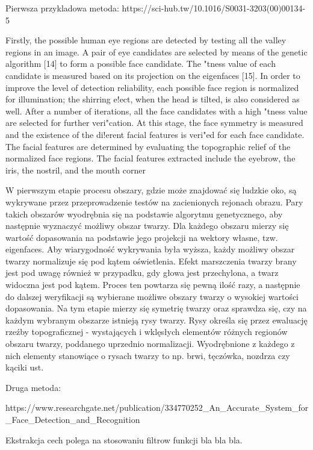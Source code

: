 Pierwsza przykladowa metoda:
https://sci-hub.tw/10.1016/S0031-3203(00)00134-5

Firstly, the possible human eye regions are detected by
testing all the valley regions in an image. A pair of eye
candidates are selected by means of the genetic algorithm
[14] to form a possible face candidate. The "tness value
of each candidate is measured based on its projection on
the eigenfaces [15]. In order to improve the level of
detection reliability, each possible face region is normalized for illumination; the shirring e!ect, when the
head is tilted, is also considered as well. After a number of
iterations, all the face candidates with a high "tness value
are selected for further veri"cation. At this stage, the face
symmetry is measured and the existence of the di!erent
facial features is veri"ed for each face candidate. The
facial features are determined by evaluating the topographic relief of the normalized face regions. The facial
features extracted include the eyebrow, the iris, the
nostril, and the mouth corner

W pierwszym etapie procesu obszary, gdzie może znajdować się ludzkie oko, są wykrywane przez przeprowadzenie testów na zacienionych rejonach obrazu. Pary takich obszarów wyodrębnia się na podstawie algorytmu genetycznego, aby następnie wyznaczyć możliwy obszar twarzy. Dla każdego obszaru mierzy się wartość dopasowania na podstawie jego projekcji na wektory własne, tzw. eigenfaces. Aby wiarygodność wykrywania była wyższa, każdy możliwy obszar twarzy normalizuje się pod kątem oświetlenia. Efekt marszczenia twarzy brany jest pod uwagę również w przypadku, gdy głowa jest przechylona, a twarz widoczna jest pod kątem. Proces ten powtarza się pewną ilość razy, a następnie do dalszej weryfikacji są wybierane możliwe obszary twarzy o wysokiej wartości dopasowania. Na tym etapie mierzy się symetrię twarzy oraz sprawdza się, czy na każdym wybranym obszarze istnieją rysy twarzy. Rysy określa się przez ewaluację rzeźby topograficznej - wystających i wklęsłych elementów różnych regionów obszaru twarzy, poddanego uprzednio normalizacji. Wyodrębnione z każdego z nich elementy stanowiące o rysach twarzy to np. brwi, tęczówka, nozdrza czy kąciki ust.

Druga metoda:


https://www.researchgate.net/publication/334770252_An_Accurate_System_for_Face_Detection_and_Recognition


Ekstrakcja cech polega na stosowaniu filtrow funkcji bla bla bla.


